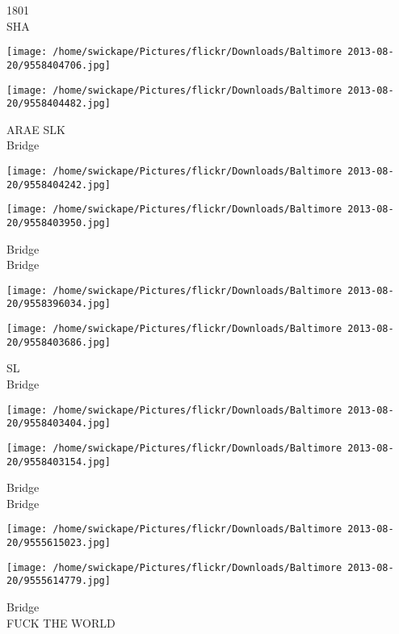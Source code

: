 \documentclass[10pt,letterpaper]{article}
\begin{document}
1801\\
SHA\\
\pagebreak

\texttt{[image: /home/swickape/Pictures/flickr/Downloads/Baltimore 2013-08-20/9558404706.jpg]}

\vspace{0.25in}
\texttt{[image: /home/swickape/Pictures/flickr/Downloads/Baltimore 2013-08-20/9558404482.jpg]}

ARAE SLK\\
Bridge\\
\pagebreak

\texttt{[image: /home/swickape/Pictures/flickr/Downloads/Baltimore 2013-08-20/9558404242.jpg]}

\vspace{0.25in}
\texttt{[image: /home/swickape/Pictures/flickr/Downloads/Baltimore 2013-08-20/9558403950.jpg]}

Bridge\\
Bridge\\
\pagebreak

\texttt{[image: /home/swickape/Pictures/flickr/Downloads/Baltimore 2013-08-20/9558396034.jpg]}

\vspace{0.25in}
\texttt{[image: /home/swickape/Pictures/flickr/Downloads/Baltimore 2013-08-20/9558403686.jpg]}

SL\\
Bridge\\
\pagebreak

\texttt{[image: /home/swickape/Pictures/flickr/Downloads/Baltimore 2013-08-20/9558403404.jpg]}

\vspace{0.25in}
\texttt{[image: /home/swickape/Pictures/flickr/Downloads/Baltimore 2013-08-20/9558403154.jpg]}

Bridge\\
Bridge\\
\pagebreak

\texttt{[image: /home/swickape/Pictures/flickr/Downloads/Baltimore 2013-08-20/9555615023.jpg]}

\vspace{0.25in}
\texttt{[image: /home/swickape/Pictures/flickr/Downloads/Baltimore 2013-08-20/9555614779.jpg]}

Bridge\\
FUCK THE WORLD\\
\pagebreak
\end{document}
